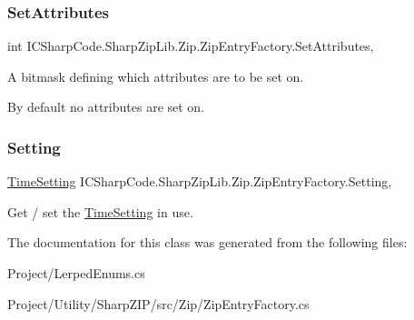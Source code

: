 \subsubsection{\texorpdfstring{Set\+Attributes}{SetAttributes}}
{\footnotesize\ttfamily int I\+C\+Sharp\+Code.\+Sharp\+Zip\+Lib.\+Zip.\+Zip\+Entry\+Factory.\+Set\+Attributes\hspace{0.3cm}{\ttfamily [get]}, {\ttfamily [set]}}



A bitmask defining which attributes are to be set on. 

By default no attributes are set on.\mbox{\label{class_i_c_sharp_code_1_1_sharp_zip_lib_1_1_zip_1_1_zip_entry_factory_a24146ff4b08ed14235b6055ba047e72a}} 
\subsubsection{\texorpdfstring{Setting}{Setting}}
{\footnotesize\ttfamily \hyperlink{class_i_c_sharp_code_1_1_sharp_zip_lib_1_1_zip_1_1_zip_entry_factory_a10d0f2a1e64abd09ea6abac4d34a9955}{Time\+Setting} I\+C\+Sharp\+Code.\+Sharp\+Zip\+Lib.\+Zip.\+Zip\+Entry\+Factory.\+Setting\hspace{0.3cm}{\ttfamily [get]}, {\ttfamily [set]}}



Get / set the \hyperlink{class_i_c_sharp_code_1_1_sharp_zip_lib_1_1_zip_1_1_zip_entry_factory_a10d0f2a1e64abd09ea6abac4d34a9955}{Time\+Setting} in use. 



The documentation for this class was generated from the following files\+:\begin{DoxyCompactItemize}
\item 
Project/Lerped\+Enums.\+cs\item 
Project/\+Utility/\+Sharp\+Z\+I\+P/src/\+Zip/Zip\+Entry\+Factory.\+cs\end{DoxyCompactItemize}

